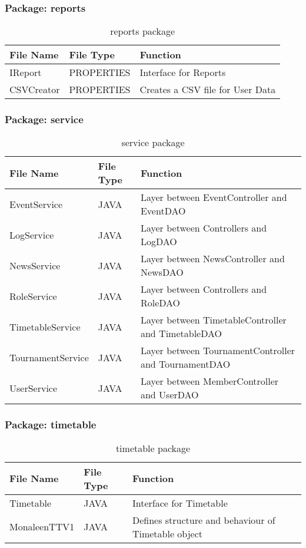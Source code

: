 \subsubsection{Package: reports}
\begin{table}[H]
\begin{center}
    \begin{tabular}{| l | l | p{5cm} |}
    \hline
    File Name & File Type & Function\\ \hline
    IReport & PROPERTIES & Interface for Reports\\ \hline
	CSVCreator & PROPERTIES & Creates a CSV file for User Data\\ \hline
    \end{tabular}
\end{center}
\caption{reports package}
\end{table}

\subsubsection{Package: service}
\begin{table}[H]
\begin{center}
    \begin{tabular}{| l | l | p{5cm} |}
    \hline
    File Name & File Type & Function\\ \hline
    EventService & JAVA & Layer between EventController and EventDAO\\ \hline
    LogService & JAVA & Layer between Controllers and LogDAO\\ \hline
	NewsService & JAVA & Layer between NewsController and NewsDAO\\ \hline
	RoleService & JAVA & Layer between Controllers and RoleDAO\\ \hline
	TimetableService & JAVA & Layer between TimetableController and TimetableDAO\\ \hline
	TournamentService & JAVA & Layer between TournamentController and TournamentDAO\\ \hline
	UserService & JAVA & Layer between MemberController and UserDAO\\ \hline
    \end{tabular}
\end{center}
\caption{service package}
\end{table}

\subsubsection{Package: timetable}
\begin{table}[H]
\begin{center}
    \begin{tabular}{| l | l | p{5cm} |}
    \hline
    File Name & File Type & Function\\ \hline
    Timetable & JAVA & Interface for Timetable\\ \hline
	MonaleenTTV1 & JAVA & Defines structure and behaviour of Timetable object\\ \hline
    \end{tabular}
\end{center}
\caption{timetable package}
\end{table}

